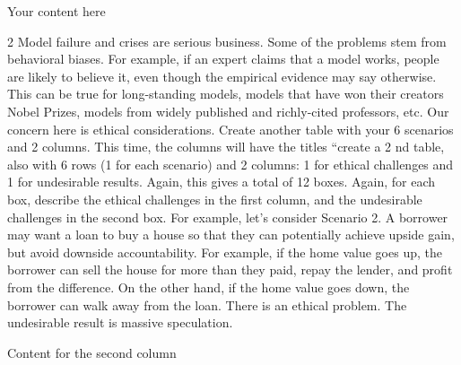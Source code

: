 \documentclass{article}
\begin{document}
Your content here

\begin{multicols}{2}
    Model failure and crises are serious business. Some of the problems stem from
    behavioral biases. For example, if an expert claims that a model works, people are likely
    to believe it, even though the empirical evidence may say otherwise. This can be true
    for long-standing models, models that have won their creators Nobel Prizes, models
    from widely published and richly-cited professors, etc.
    Our concern here is ethical considerations. Create another table with your 6 scenarios
    and 2 columns. This time, the columns will have the titles “create a 2
    nd
    table, also with 6
    rows (1 for each scenario) and 2 columns: 1 for ethical challenges and 1 for undesirable
    results. Again, this gives a total of 12 boxes. Again, for each box, describe the ethical
    challenges in the first column, and the undesirable challenges in the second box.
    For example, let’s consider Scenario 2. A borrower may want a loan to buy a house so
    that they can potentially achieve upside gain, but avoid downside accountability. For
    example, if the home value goes up, the borrower can sell the house for more than they
    paid, repay the lender, and profit from the difference. On the other hand, if the home
    value goes down, the borrower can walk away from the loan. There is an ethical
    problem. The undesirable result is massive speculation.

\end{multicols} 

Content for the second column
\end{document}
